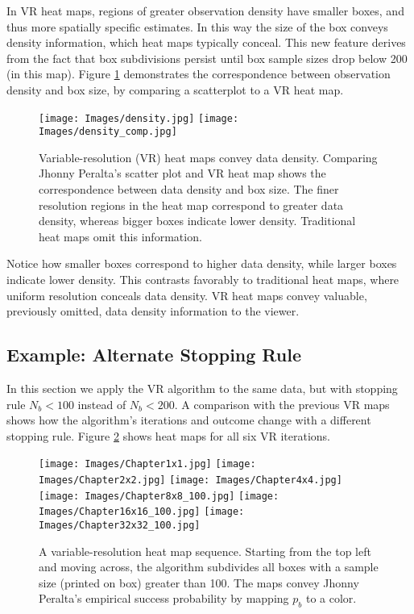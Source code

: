 In VR heat maps, regions of greater observation density have smaller boxes, and thus more spatially specific estimates. In this way the size of the box conveys density information, which heat maps typically conceal. This new feature derives from the fact that box subdivisions persist until box sample sizes drop below 200 (in this map). Figure \ref{fig:density} demonstrates the correspondence between observation density and box size, by comparing a scatterplot to a VR heat map. 
        \begin{figure}[H]
      	\centering
      	\texttt{[image: Images/density.jpg]}
      	\texttt{[image: Images/density\_comp.jpg]} 
      	\caption{Variable-resolution (VR) heat maps convey data density. Comparing Jhonny Peralta's scatter plot and VR heat map shows the correspondence between data density and box size. The finer resolution regions in the heat map correspond to greater data density, whereas bigger boxes indicate lower density. Traditional heat maps omit this information.}
      	\label{fig:density}
      	\end{figure}
Notice how smaller boxes correspond to higher data density, while larger boxes indicate lower density. This contrasts favorably to traditional heat maps, where uniform resolution conceals data density. VR heat maps convey valuable, previously omitted, data density information to the viewer. 
      	
\subsection{Example: Alternate Stopping Rule} %
      	
In this section we apply the VR algorithm to the same data, but with stopping rule $N_{b} < 100$ instead of $N_{b} < 200$. A comparison with the previous VR maps shows how the algorithm's iterations and outcome change with a different stopping rule. Figure \ref{fig:altsr} shows heat maps for all six VR iterations.
        \begin{figure}[H]
      	\centering
      	\texttt{[image: Images/Chapter1x1.jpg]}
      	\texttt{[image: Images/Chapter2x2.jpg]}
      	\texttt{[image: Images/Chapter4x4.jpg]}
      	\texttt{[image: Images/Chapter8x8\_100.jpg]}
      	\texttt{[image: Images/Chapter16x16\_100.jpg]}
      	\texttt{[image: Images/Chapter32x32\_100.jpg]}
      	\caption{A variable-resolution heat map sequence. Starting from the top left and moving across, the algorithm subdivides all boxes with a sample size (printed on box) greater than 100. The maps convey Jhonny Peralta's empirical success probability by mapping $p_{b}$ to a color.}
      	\label{fig:altsr}
\end{figure} 	

